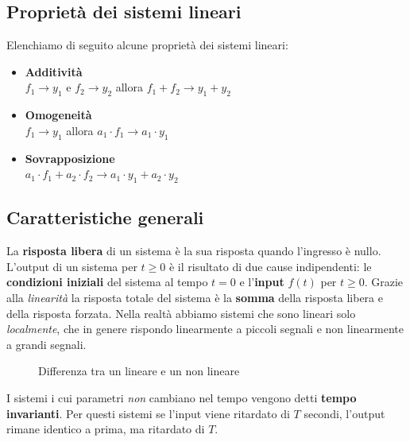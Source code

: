 \documentclass[a4paper, titlepage, oneside]{scrbook}
\begin{document}
\subsection{Proprietà dei sistemi lineari}
Elenchiamo di seguito alcune proprietà dei sistemi lineari:
\begin{itemize}
	\item \textbf{Additività}\\
	$f_{1} \rightarrow y_{1}$ e $f_{2} \rightarrow y_{2}$ allora $f_{1} +f_{2} \rightarrow y_{1}+y_{2}$
	\item \textbf{Omogeneità}\\
	$f_{1} \rightarrow y_{1}$ allora $a_{1} \cdot f_{1}\rightarrow a_{1}\cdot y_{1}$
	\item \textbf{Sovrapposizione}\\
	$a_{1} \cdot f_{1} + a_{2}\cdot f_{2} \rightarrow a_{1}\cdot y_{1}+a_{2}\cdot y_{2}$
\end{itemize}

\subsection{Caratteristiche generali}
La \textbf{risposta libera} di un sistema è la sua risposta quando l'ingresso è nullo.
L'output di un sistema per $t\geq0$ è il risultato di due cause indipendenti: le \textbf{condizioni iniziali} del sistema al tempo $t=0$ e l'\textbf{input} $f(t)$ per $t\geq0$.
Grazie alla \textit{linearità} la risposta totale del sistema è la \textbf{somma} della risposta libera e della risposta forzata.
Nella realtà abbiamo sistemi che sono lineari solo \textit{localmente}, che in genere rispondo linearmente a piccoli segnali e non linearmente a grandi segnali.
\begin{figure}[h]
	\centering
	\caption{Differenza tra un lineare e un non lineare}
	\label{fig:lineare_vs_nonlineare}
\end{figure}

I sistemi i cui parametri \textit{non} cambiano nel tempo vengono detti \textbf{tempo invarianti}.
Per questi sistemi se l'input viene ritardato di $T$ secondi, l'output rimane identico a prima, ma ritardato di $T$.
\end{document}
